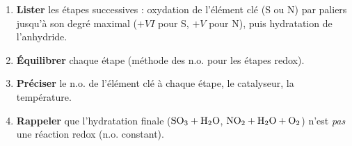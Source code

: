 \documentclass[11pt]{article}
\begin{document}
\begin{methode}
\begin{enumerate}
\item \textbf{Lister} les étapes successives : oxydation de l'élément clé (S ou N) par paliers jusqu'à son degré maximal ($+VI$ pour S, $+V$ pour N), puis hydratation de l'anhydride.
\item \textbf{Équilibrer} chaque étape (méthode des n.o. pour les étapes redox).
\item \textbf{Préciser} le n.o. de l'élément clé à chaque étape, le catalyseur, la température.
\item \textbf{Rappeler} que l'hydratation finale ($\ce{SO3 + H2O}$, $\ce{NO2 + H2O + O2}$) n'est \emph{pas} une réaction redox (n.o. constant).
\end{enumerate}
\end{methode}
\end{document}
